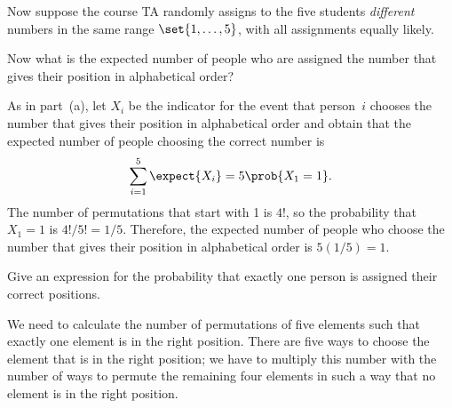 \begin{problem}
\eparts

\bigskip

Now suppose the course TA randomly assigns to the five
students \emph{different} numbers in the same range $\set{1,\dots,5}$,
with all assignments equally likely.

\bparts
\ppart Now what is the expected number of people who are
assigned the number that gives their position in alphabetical order?

\begin{solution}
As in part~(a), let $X_i$ be the indicator for the event that
  person~$i$ chooses the number that gives their position in
  alphabetical order and obtain that the expected number of people
  choosing the correct number is
\[
 \sum_{i=1}^5 \expect{X_i} = 5 \prob{X_1  = 1}.
\]
The number of permutations that start with 1 is $4!$, so the
probability that $X_1 = 1$ is $4!/5! = 1/5$.  Therefore, the expected
number of people who choose the number that gives their position in
alphabetical order is $5(1/5) = 1$.
\end{solution}

\ppart Give an expression for the probability that exactly one person
is assigned their correct positions.

\begin{solution}
We need to calculate the number of permutations of five
  elements such that exactly one element is in the right position.
  There are five ways to choose the element that is in the right
  position; we have to multiply this number with the number of ways to
  permute the remaining four elements in such a way that no element is
  in the right position.


\end{solution}
\end{problem}
